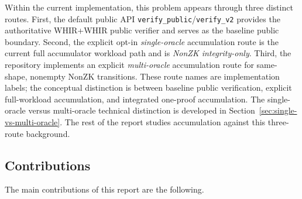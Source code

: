 \documentclass[11pt]{article}
\theoremstyle{definition}
\begin{document}
Within the current implementation, this problem appears through three distinct
routes. First, the default public API
\texttt{verify\_public}/\texttt{verify\_v2} provides the authoritative WHIR+WHIR
public verifier and serves as the baseline public boundary. Second, the explicit
opt-in \emph{single-oracle} accumulation route is the current full accumulator
workload path and is \emph{NonZK integrity-only}. Third, the repository
implements an explicit \emph{multi-oracle} accumulation route for same-shape,
nonempty NonZK transitions.
These route names are implementation labels; the conceptual distinction is
between baseline public verification, explicit full-workload accumulation, and
integrated one-proof accumulation. The single-oracle versus multi-oracle
technical distinction is developed in Section~\ref{sec:single-vs-multi-oracle}.
The rest of the report studies accumulation against this three-route background.
\subsection{Contributions}
\label{sec:contributions}
The main contributions of this report are the following.
\end{document}
